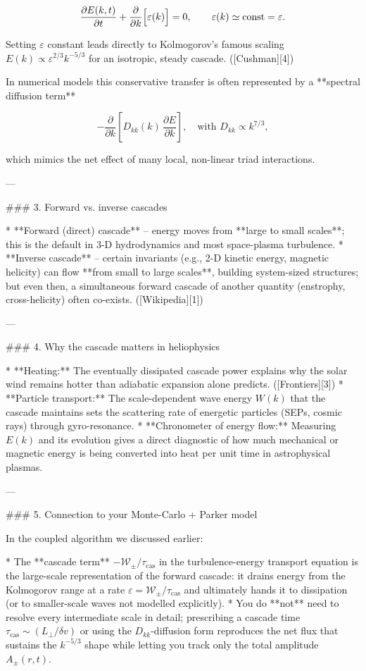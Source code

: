 $$
\frac{\partial E(k,t)}{\partial t}
   +\frac{\partial}{\partial k}\Bigl[\varepsilon(k)\Bigr]=0,
\qquad
\varepsilon(k)\simeq\text{const}= \varepsilon.
$$

Setting $\varepsilon$ constant leads directly to Kolmogorov’s famous scaling $E(k)\propto \varepsilon^{2/3}k^{-5/3}$ for an isotropic, steady cascade. ([Cushman][4])

In numerical models this conservative transfer is often represented by a **spectral diffusion term**

$$
-\frac{\partial}{\partial k}\!\left[D_{kk}(k)\,\frac{\partial E}{\partial k}\right],
\quad\text{with }D_{kk}\propto k^{7/3},
$$

which mimics the net effect of many local, non-linear triad interactions.

---

### 3.  Forward vs. inverse cascades

* **Forward (direct) cascade** – energy moves from **large to small scales**; this is the default in 3-D hydrodynamics and most space-plasma turbulence.
* **Inverse cascade** – certain invariants (e.g., 2-D kinetic energy, magnetic helicity) can flow **from small to large scales**, building system-sized structures; but even then, a simultaneous forward cascade of another quantity (enstrophy, cross-helicity) often co-exists. ([Wikipedia][1])

---

### 4.  Why the cascade matters in heliophysics

* **Heating:** The eventually dissipated cascade power explains why the solar wind remains hotter than adiabatic expansion alone predicts. ([Frontiers][3])
* **Particle transport:** The scale-dependent wave energy $W(k)$ that the cascade maintains sets the scattering rate of energetic particles (SEPs, cosmic rays) through gyro-resonance.
* **Chronometer of energy flow:** Measuring $E(k)$ and its evolution gives a direct diagnostic of how much mechanical or magnetic energy is being converted into heat per unit time in astrophysical plasmas.

---

### 5.  Connection to your Monte-Carlo + Parker model

In the coupled algorithm we discussed earlier:

* The **cascade term** $-\mathcal W_\pm/\tau_{\text{cas}}$ in the turbulence-energy transport equation is the large-scale representation of the forward cascade: it drains energy from the Kolmogorov range at a rate $\varepsilon = \mathcal W_\pm/\tau_{\text{cas}}$ and ultimately hands it to dissipation (or to smaller-scale waves not modelled explicitly).
* You do **not** need to resolve every intermediate scale in detail; prescribing a cascade time $\tau_{\text{cas}} \sim (L_\perp / \delta v)$ or using the $D_{kk}$-diffusion form reproduces the net flux that sustains the $k^{-5/3}$ shape while letting you track only the total amplitude $A_\pm(r,t)$.

